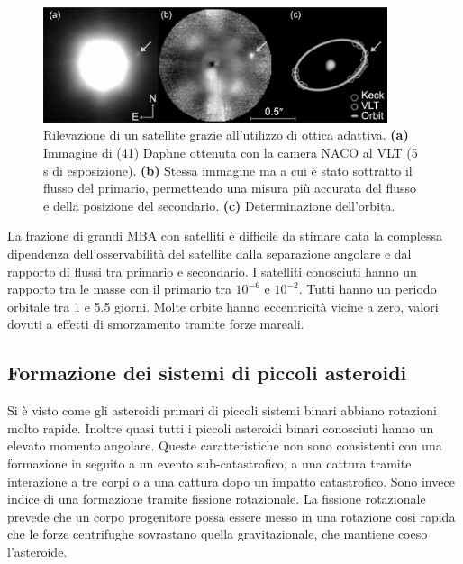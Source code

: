 \documentclass[a4paper,11pt,openright]{book}
\begin{document}
\begin{figure}[!h]
    \centering
    \includegraphics[width=0.9\textwidth]{figure/binaries_direct_imaging.jpg}
    \caption[Rilevazione del satellite di (41) Daphne grazie all'uso dell'ottica adattiva.]{Rilevazione di un satellite grazie all'utilizzo di ottica adattiva. \textbf{(a)} Immagine di (41) Daphne ottenuta con la camera NACO al VLT (5 s di esposizione). \textbf{(b)} Stessa immagine ma a cui è stato sottratto il flusso del primario, permettendo una misura più accurata del flusso e della posizione del secondario. \textbf{(c)} Determinazione dell'orbita. \citep{carry_ao_2009}}
    \label{fig:binaries_direct_imaging}
\end{figure}

La frazione di grandi MBA con satelliti è difficile da stimare data la complessa dipendenza dell'osservabilità del satellite dalla separazione angolare e dal rapporto di flussi tra primario e secondario. I satelliti conosciuti hanno un rapporto tra le masse con il primario tra $10^{-6}$ e $10^{-2}$. Tutti hanno un periodo orbitale tra 1 e 5.5 giorni. Molte orbite hanno eccentricità vicine a zero, valori dovuti a effetti di smorzamento tramite forze mareali.

\subsection{Formazione dei sistemi di piccoli asteroidi}
Si è visto come gli asteroidi primari di piccoli sistemi binari abbiano rotazioni molto rapide. Inoltre quasi tutti i piccoli asteroidi binari conosciuti hanno un elevato momento angolare. Queste caratteristiche non sono consistenti con una formazione in seguito a un evento sub-catastrofico, a una cattura tramite interazione a tre corpi o a una cattura dopo un impatto catastrofico. Sono invece indice di una formazione tramite fissione rotazionale. La fissione rotazionale prevede che un corpo progenitore possa essere messo in una rotazione così rapida che le forze centrifughe sovrastano quella gravitazionale, che mantiene coeso l'asteroide.
\end{document}
